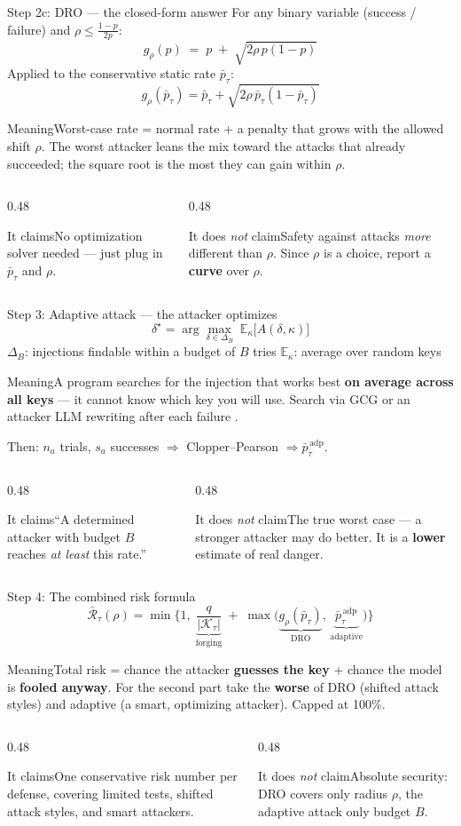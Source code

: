 \documentclass[aspectratio=169,11pt]{beamer}
\newcommand{\K}{\mathcal{K}_\tau}
\newcommand{\pbar}{\bar p_\tau}
\newcommand{\padp}{\bar p^{\,\mathrm{adp}}_\tau}
\newcommand{\plain}[1]{\begin{block}{Meaning}#1\end{block}}
\newcommand{\claims}[2]{%
  \begin{columns}[T]
    \begin{column}{0.48\textwidth}
      \begin{exampleblock}{It claims}#1\end{exampleblock}
    \end{column}
    \begin{column}{0.48\textwidth}
      \begin{alertblock}{It does \emph{not} claim}#2\end{alertblock}
    \end{column}
  \end{columns}}
\begin{document}
\begin{frame}{Step 2c: DRO --- the closed-form answer}
  For any binary variable (success / failure) and $\rho \le \frac{1-p}{2p}$:
  \[
    \boxed{\;
    g_\rho(p) \;=\; p \;+\; \sqrt{2\rho\,p(1-p)} \;}
  \]
  \small
  Applied to the conservative static rate $\pbar$:
  \[
    g_\rho(\pbar) = \pbar + \sqrt{2\rho\,\pbar(1-\pbar)}
  \]
  \plain{Worst-case rate = normal rate + a penalty that grows with the allowed shift $\rho$. The worst attacker leans the mix toward the attacks that already succeeded; the square root is the most they can gain within $\rho$.}
  \claims{No optimization solver needed --- just plug in $\pbar$ and $\rho$.}
  {Safety against attacks \emph{more} different than $\rho$. Since $\rho$ is a choice, report a \textbf{curve} over $\rho$.}
\end{frame}

\begin{frame}{Step 3: Adaptive attack --- the attacker optimizes}
  \[
    \delta^\star = \arg\max_{\delta \in \Delta_B} \; \mathbb{E}_{\kappa}\big[A(\delta,\kappa)\big]
  \]
  \small
  $\Delta_B$: injections findable within a budget of $B$ tries \quad $\mathbb{E}_\kappa$: average over random keys
  \plain{A program searches for the injection that works best \textbf{on average across all keys} --- it cannot know which key you will use. Search via GCG \cite{zou2023gcg} or an attacker LLM rewriting after each failure \cite{chao2023pair}.}
  Then: $n_a$ trials, $s_a$ successes $\Rightarrow$ Clopper--Pearson $\Rightarrow \padp$.
  \claims{``A determined attacker with budget $B$ reaches \emph{at least} this rate.''}
  {The true worst case --- a stronger attacker may do better. It is a \textbf{lower} estimate of real danger.}
\end{frame}

\begin{frame}{Step 4: The combined risk formula}
  \[
    \boxed{\;
    \bar{\mathcal{R}}_\tau(\rho) = \min\Bigg\{1,\;
    \underbrace{\frac{q}{|\K|}}_{\text{forging}}
    \;+\; \max\!\Big(\underbrace{g_\rho(\pbar)}_{\text{DRO}},\, \underbrace{\padp}_{\text{adaptive}}\Big)
    \Bigg\}\;}
  \]
  \small
  \plain{Total risk = chance the attacker \textbf{guesses the key} + chance the model is \textbf{fooled anyway}. For the second part take the \textbf{worse} of DRO (shifted attack styles) and adaptive (a smart, optimizing attacker). Capped at 100\%.}
  \claims{One conservative risk number per defense, covering limited tests, shifted attack styles, and smart attackers.}
  {Absolute security: DRO covers only radius $\rho$, the adaptive attack only budget $B$.}
\end{frame}
\end{document}
